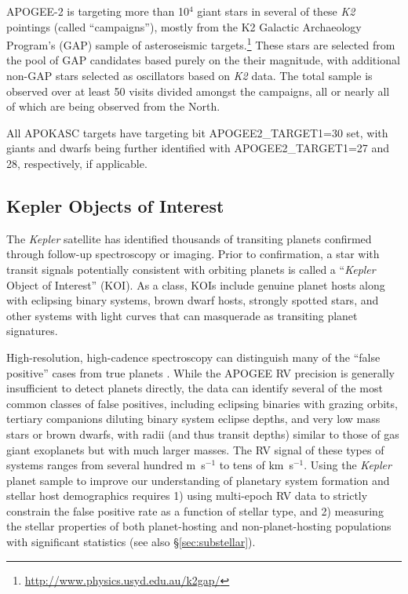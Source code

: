 \documentclass[12pt,twocolumn]{emulateapj}
\begin{document}
APOGEE-2 is targeting more than 10$^4$ giant stars in several of these {\it K2} pointings (called ``campaigns''), mostly from the K2 Galactic Archaeology Program's (GAP) sample of asteroseismic targets.\footnote{\url{ http://www.physics.usyd.edu.au/k2gap/}}  These stars are selected from the pool of GAP candidates based purely on the their magnitude, with additional non-GAP stars selected as oscillators based on {\it K2} data. The total sample is observed over at least 50 visits divided amongst the campaigns, all or nearly all of which are being observed from the North.

All APOKASC targets have targeting bit APOGEE2\_TARGET1=30 set, with giants and dwarfs being further identified with APOGEE2\_TARGET1=27 and 28, respectively, if applicable.


\subsection{Kepler Objects of Interest}
\label{sec:koi}

The {\it Kepler} satellite has identified thousands of transiting planets confirmed through follow-up spectroscopy or imaging.  Prior to confirmation, a star with 
transit signals potentially consistent with orbiting planets
is called a ``{\it Kepler} Object of Interest'' (KOI).  As a class, KOIs include genuine planet hosts along with eclipsing binary systems, brown dwarf hosts, strongly spotted stars, and other systems with light curves that can masquerade as transiting planet signatures.  

High-resolution, high-cadence spectroscopy can
distinguish many of the ``false positive'' cases from true planets
\citep{Fleming_2015_KOIs}.
While the APOGEE RV precision is generally insufficient to detect planets directly, the data can identify several of the most common classes of false positives, including eclipsing binaries with grazing orbits, tertiary companions diluting binary system eclipse depths, and very low mass stars or brown dwarfs, with radii (and thus transit depths) similar to those of gas giant exoplanets but with much larger masses.  The RV signal of these types of systems ranges from several hundred m~s$^{-1}$ to tens of km~s$^{-1}$.
Using the {\it Kepler} planet sample to improve our understanding of planetary system formation and stellar host demographics requires 1) using multi-epoch RV data to strictly constrain the false positive rate as a function of stellar type, and 2) measuring the stellar properties of both planet-hosting and non-planet-hosting populations with significant statistics (see also \S\ref{sec:substellar}). 
\end{document}
